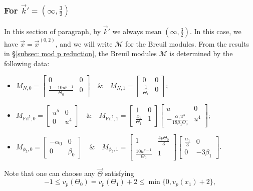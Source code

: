 \documentclass[11pt]{amsart}
\theoremstyle{definition}
\numberwithin{equation}{subsection}
\theoremstyle{plain}
\theoremstyle{plain}
\theoremstyle{plain}
\theoremstyle{plain}
\theoremstyle{plain}
\theoremstyle{plain}
\theoremstyle{plain}
\theoremstyle{plain}
\theoremstyle{plain}
\theoremstyle{plain}
\theoremstyle{plain}
\theoremstyle{plain}
\theoremstyle{definition}
\theoremstyle{definition}
\theoremstyle{definition}
\theoremstyle{remark}
\renewcommand{\(}{\textup{(}}
\renewcommand{\)}{\textup{)}}
\newcommand{\cM}{\mathcal{M}}
\newcommand{\Fil}{\mathrm{Fil}}
\newcommand{\vx}{\vec{x}}
\newcommand{\vk}{\vec{k}}
\newcommand{\vTh}{\vec{\Theta}}
\begin{document}
\subsubsection{\textbf{For $\vk'=(\infty,\frac{3}{2})$}}\label{subsubsec: vr=(1,5), vk=(infty,3/2)}
In this section of paragraph, by $\vk'$ we always mean $(\infty,\frac{3}{2})$. In this case, we have $\vx=\vx^{(0,2)}$, and we will write $\cM$ for the Breuil modules. From the results in \S\ref{subsec: mod p reduction}, the Breuil modules $\cM$ is determined by the following data:
\begin{itemize}[leftmargin=*]
  \item $M_{N,0}=
  \begin{bmatrix}
    0 & 0 \\
    \frac{1-10u^{p-1}}{\Theta_0} & 0
  \end{bmatrix}\quad\&\quad
  M_{N,1}=
  \begin{bmatrix}
    0 & 0 \\
    \frac{1}{\Theta_1} & 0
  \end{bmatrix}$;
  \item $M_{\Fil^5,0}=
  \begin{bmatrix}
    u^5 & 0 \\
    0 & u^4
  \end{bmatrix}\quad\&\quad
  M_{\Fil^5,1}=
  \begin{bmatrix}
    1 & 0 \\
    \frac{x_1}{\Theta_1} & 1
  \end{bmatrix}
  \begin{bmatrix}
    u & 0 \\
    -\frac{\alpha_1u^3}{18\beta_1\Theta_0} & u^4
  \end{bmatrix}$;
  \item $M_{\phi_5,0}=
  \begin{bmatrix}
    -\alpha_0 & 0\\
    0 & \beta_0
  \end{bmatrix}\quad\&\quad
  M_{\phi_5,1}=
  \begin{bmatrix}
    1 & \frac{4p\Theta_0}{3} \\
    \frac{10u^{p-1}}{\Theta_0} & 1
  \end{bmatrix}
  \begin{bmatrix}
    \frac{\alpha_1}{3} & 0\\
    0 & -3\beta_1
  \end{bmatrix}$.
\end{itemize}
Note that one can choose any $\vTh$ satisfying
$$-1\leq v_p(\Theta_0)=v_p(\Theta_1)+2\leq \min\{0,v_p(x_1)+2\},$$
\end{document}
